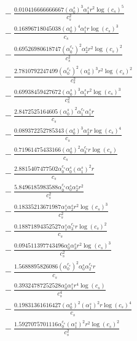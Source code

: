 \documentclass[10pt]{article}
\begin{document}
\begin{align*}
&{}  - \frac{0.010416666666667 \left(\alpha_{0}^s\right)^{3} \alpha_{1}^s r^{2} \log{\left(c_{s} \right)}^{5}}{c_{s}^{2}} \\
&{}  - \frac{0.16896718045038 \left(\alpha_{0}^s\right)^{4} \alpha_{1}^s r \log{\left(c_{s} \right)}^{3}}{c_{s}} \\
&{}  - \frac{0.69526980618747 \left(\alpha_{0}^{c_s}\right)^{2} \alpha_{2}^s r^{2} \log{\left(c_{s} \right)}^{2}}{c_{s}^{2}} \\
&{}  - \frac{2.7810792247499 \left(\alpha_{0}^{c_s}\right)^{2} \left(\alpha_{0}^s\right)^{3} r^{2} \log{\left(c_{s} \right)}^{2}}{c_{s}^{2}} \\
&{}  - \frac{0.69938459427672 \left(\alpha_{0}^s\right)^{3} \alpha_{1}^s r^{2} \log{\left(c_{s} \right)}^{3}}{c_{s}^{2}} \\
&{}  - \frac{2.8472525164605 \left(\alpha_{0}^s\right)^{2} \alpha_{1}^{c_s} \alpha_{1}^s r}{c_{s}} \\
&{}  - \frac{0.089372252785343 \left(\alpha_{0}^s\right)^{3} \alpha_{2}^s r \log{\left(c_{s} \right)}^{4}}{c_{s}} \\
&{}  - \frac{0.71961475433166 \left(\alpha_{0}^s\right)^{2} \alpha_{3}^{c_s} r \log{\left(c_{s} \right)}}{c_{s}} \\
&{}  - \frac{2.8815407477502 \alpha_{0}^{c_s} \alpha_{0}^s \left(\alpha_{1}^s\right)^{2} r}{c_{s}} \\
&{}  - \frac{5.8496185983588 \alpha_{0}^{c_s} \alpha_{0}^s \alpha_{2}^s r^{2}}{c_{s}^{2}} \\
&{}  - \frac{0.18335213671987 \alpha_{1}^s \alpha_{2}^s r^{2} \log{\left(c_{s} \right)}^{3}}{c_{s}^{2}} \\
&{}  - \frac{0.18871894352527 \alpha_{1}^s \alpha_{3}^{c_s} r \log{\left(c_{s} \right)}^{2}}{c_{s}} \\
&{}  - \frac{0.094511397743496 \alpha_{0}^s \alpha_{3}^s r^{2} \log{\left(c_{s} \right)}^{3}}{c_{s}^{2}} \\
&{}  - \frac{1.5688895826086 \left(\alpha_{0}^{c_s}\right)^{2} \alpha_{0}^s \alpha_{2}^{c_s} r}{c_{s}} \\
&{}  - \frac{0.39324787252528 \alpha_{0}^s \alpha_{1}^s r^{4} \log{\left(c_{s} \right)}}{c_{s}^{4}} \\
&{}  - \frac{0.19831361616427 \left(\alpha_{0}^s\right)^{2} \left(\alpha_{1}^s\right)^{2} r \log{\left(c_{s} \right)}^{4}}{c_{s}} \\
&{}  - \frac{1.5927075701116 \alpha_{0}^{c_s} \left(\alpha_{1}^s\right)^{2} r^{2} \log{\left(c_{s} \right)}^{2}}{c_{s}^{2}} \\

\end{align*}
\end{document}
